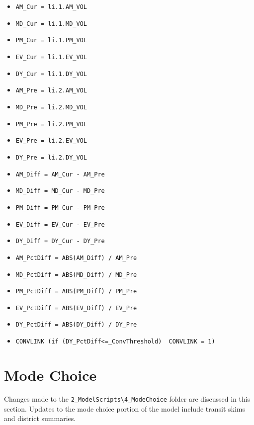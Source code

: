 \documentclass[
  letterpaper,
  DIV=11,
  numbers=noendperiod]{scrreprt}
\providecommand{\tightlist}{%
  \setlength{\itemsep}{0pt}\setlength{\parskip}{0pt}}\usepackage{longtable,booktabs,array}
\begin{document}
\begin{itemize}
\tightlist
\item
  \texttt{AM\_Cur\ =\ li.1.AM\_VOL}
\item
  \texttt{MD\_Cur\ =\ li.1.MD\_VOL}
\item
  \texttt{PM\_Cur\ =\ li.1.PM\_VOL}
\item
  \texttt{EV\_Cur\ =\ li.1.EV\_VOL}
\item
  \texttt{DY\_Cur\ =\ li.1.DY\_VOL}
\item
  \texttt{AM\_Pre\ =\ li.2.AM\_VOL}
\item
  \texttt{MD\_Pre\ =\ li.2.MD\_VOL}
\item
  \texttt{PM\_Pre\ =\ li.2.PM\_VOL}
\item
  \texttt{EV\_Pre\ =\ li.2.EV\_VOL}
\item
  \texttt{DY\_Pre\ =\ li.2.DY\_VOL}
\item
  \texttt{AM\_Diff\ =\ AM\_Cur\ -\ AM\_Pre}
\item
  \texttt{MD\_Diff\ =\ MD\_Cur\ -\ MD\_Pre}
\item
  \texttt{PM\_Diff\ =\ PM\_Cur\ -\ PM\_Pre}
\item
  \texttt{EV\_Diff\ =\ EV\_Cur\ -\ EV\_Pre}
\item
  \texttt{DY\_Diff\ =\ DY\_Cur\ -\ DY\_Pre}
\item
  \texttt{AM\_PctDiff\ =\ ABS(AM\_Diff)\ /\ AM\_Pre}
\item
  \texttt{MD\_PctDiff\ =\ ABS(MD\_Diff)\ /\ MD\_Pre}
\item
  \texttt{PM\_PctDiff\ =\ ABS(PM\_Diff)\ /\ PM\_Pre}
\item
  \texttt{EV\_PctDiff\ =\ ABS(EV\_Diff)\ /\ EV\_Pre}
\item
  \texttt{DY\_PctDiff\ =\ ABS(DY\_Diff)\ /\ DY\_Pre}
\item
  \texttt{CONVLINK\ (if\ (DY\_PctDiff\textless{}=\_ConvThreshold)\ \ CONVLINK\ =\ 1)}
\end{itemize}


\hypertarget{mode-choice-1}{%
\chapter{Mode Choice}\label{mode-choice-1}}

Changes made to the
\texttt{2\_ModelScripts\textbackslash{}4\_ModeChoice} folder are
discussed in this section. Updates to the mode choice portion of the
model include transit skims and district summaries.
\end{document}
